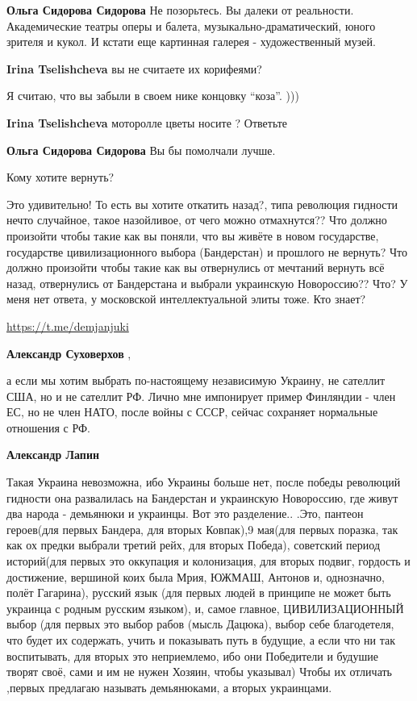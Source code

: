\begin{itemize}
\begin{itemize}
\textbf{Ольга Сидорова Сидорова} Не позорьтесь. Вы далеки от реальности. Академические театры оперы и балета, музыкально-драматический, юного зрителя и кукол. И кстати еще картинная галерея - художественный музей.

\textbf{Irina Tselishcheva} вы не считаете их корифеями?

Я считаю, что вы забыли в своем нике концовку \enquote{коза}. )))

\textbf{Irina Tselishcheva} моторолле цветы носите ? Ответьте

\textbf{Ольга Сидорова Сидорова}
Вы бы помолчали лучше.
\end{itemize} %

Кому хотите вернуть?


Это удивительно! То есть вы хотите откатить назад?, типа революция гидности
нечто случайное, такое назойливое, от чего можно отмахнутся?? Что должно
произойти чтобы такие как вы поняли, что вы живёте в новом
государстве, государстве цивилизационного выбора (Бандерстан) и прошлого не
вернуть? Что должно произойти чтобы такие как вы отвернулись от мечтаний вернуть
всё назад, отвернулись от Бандерстана и выбрали украинскую Новороссию?? Что? У
меня нет ответа, у московской интеллектуальной элиты тоже. Кто знает?

\url{https://t.me/demjanjuki}

\begin{itemize} %
\textbf{Александр Суховерхов} , 

а если мы хотим выбрать по-настоящему независимую Украину, не сателлит США, но
и не сателлит РФ. Лично мне импонирует пример Финляндии - член ЕС, но не член
НАТО, после войны с СССР, сейчас сохраняет нормальные отношения с РФ.

\textbf{Александр Лапин} 

Такая Украина невозможна, ибо Украины больше нет, после победы революций
гидности она развалилась на Бандерстан и украинскую Новороссию, где живут два
народа - демьянюки и украинцы. Вот это разделение.. .Это, пантеон героев(для
первых Бандера, для вторых Ковпак),9 мая(для первых поразка, так как ох предки
выбрали третий рейх, для вторых Победа), советский период историй(для первых это
оккупация и колонизация, для вторых подвиг, гордость и достижение, вершиной коих
была Мрия, ЮЖМАШ, Антонов и, однозначно, полёт Гагарина), русский язык (для первых
людей в принципе не может быть украинца с родным русским языком), и, самое
главное, ЦИВИЛИЗАЦИОННЫЙ выбор (для первых это выбор рабов (мысль Дацюка), выбор
себе благодетеля, что будет их содержать, учить и показывать путь в будущие, а
если что ни так воспитывать, для вторых это неприемлемо, ибо они Победители и
будушие творят своё, сами и им не нужен Хозяин, чтобы указывал) Чтобы их отличать
,первых предлагаю называть демьянюками, а вторых украинцами.


\end{itemize}
\end{itemize}
